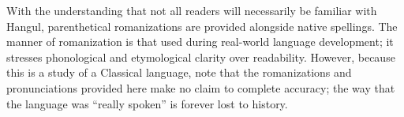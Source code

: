 With the understanding that not all readers will necessarily be familiar with Hangul, parenthetical romanizations are provided alongside native spellings.
The manner of romanization is that used during real-world language development; it stresses phonological and etymological clarity over readability.
However, because this is a study of a Classical language, note that the romanizations and pronunciations provided here make no claim to complete accuracy; the way that the language was “really spoken” is forever lost to history.

\emptybreak[plain]
